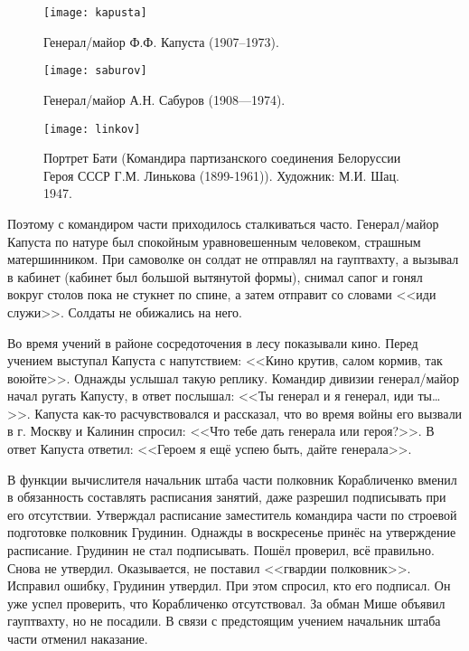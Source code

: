 \begin{figure}[h]
	\centering
	
	\begin{minipage}[h]{0.3\textwidth}			
		\texttt{[image: kapusta]}
		\caption{Генерал\-/майор Ф.Ф. Капуста (1907--1973).}
		\label{fig:kapusta}		
	\end{minipage}	
	\hfill
	\begin{minipage}[h]{0.3\textwidth}			
		\texttt{[image: saburov]}
		\caption{Генерал\-/майор А.Н. Сабуров (1908—1974).}
		\label{fig:saburov}
	\end{minipage}
	\hfill
	\begin{minipage}[h]{0.3\textwidth}		
		\texttt{[image: linkov]}
		\caption{Портрет Бати (Командира партизанского соединения Белоруссии Героя СССР Г.М. Линькова (1899-1961)). Художник: М.И. Шац. 1947.}
		\label{fig:linkov}
	\end{minipage}
\end{figure}

Поэтому с командиром части приходилось сталкиваться часто. Генерал\-/майор Капуста по натуре был спокойным уравновешенным человеком, страшным матершинником. При самоволке он солдат не отправлял на гауптвахту, а вызывал в кабинет (кабинет был большой вытянутой формы), снимал сапог и гонял вокруг столов пока не стукнет по спине, а затем отправит со словами <<иди служи>>. Солдаты не обижались на него.

Во время учений в районе сосредоточения в лесу показывали кино. Перед учением выступал Капуста с напутствием: <<Кино крутив, салом кормив, так воюйте>>. Однажды услышал такую реплику. Командир дивизии генерал\-/майор начал ругать Капусту, в ответ послышал: <<Ты генерал и я генерал, иди ты…>>. Капуста как-то расчувствовался и рассказал, что во время войны его вызвали в г. Москву и Калинин спросил: <<Что тебе дать генерала или героя?>>. В ответ Капуста ответил: <<Героем я ещё успею быть, дайте генерала>>. 

В функции вычислителя начальник штаба части полковник Корабличенко вменил в обязанность составлять расписания занятий, даже разрешил подписывать при его отсутствии. Утверждал расписание заместитель командира части по строевой подготовке полковник Грудинин. Однажды в воскресенье принёс на утверждение расписание. Грудинин не стал подписывать. Пошёл проверил, всё правильно. Снова не утвердил. Оказывается, не поставил <<гвардии полковник>>. Исправил ошибку, Грудинин утвердил. При этом спросил, кто его подписал. Он уже успел проверить, что Корабличенко отсутствовал. За обман Мише объявил гауптвахту, но не посадили. В связи с предстоящим учением начальник штаба части отменил наказание.

